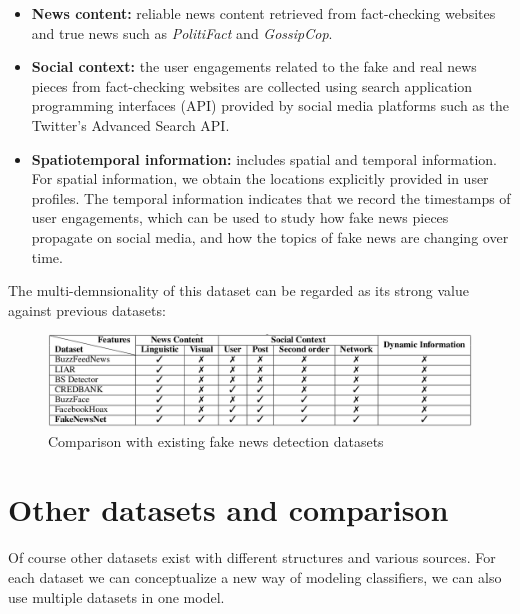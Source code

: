 \documentclass[10pt, english]{report}
\begin{document}
\begin{itemize}
\item \textbf{News content:} reliable news content retrieved from fact-checking websites and true news such as \textit{PolitiFact} and \textit{GossipCop}.
\item \textbf{Social context:} the user engagements related to the fake and real news pieces from fact-checking websites are collected using search application programming interfaces (API) provided by social media platforms such as the Twitter's Advanced Search API.
\item \textbf{Spatiotemporal information:} includes spatial and temporal information. For spatial information, we obtain the locations explicitly provided in user profiles. The temporal information indicates that we record the timestamps of user engagements, which can be used to study how fake news pieces propagate on social media, and how the topics of fake news are changing over time.
\end{itemize}

The multi-demnsionality of this dataset can be regarded as its strong value against previous datasets:

\begin{figure}[H]
	\centering
	\includegraphics[scale=0.43]{img/fake_news_net_comparison.png}
	\caption{Comparison with existing fake news detection datasets \cite{shu2018fakenewsnet}}
\end{figure}

\newpage
\section{Other datasets and comparison \cite{de2021identifying}}
Of course other datasets exist with different structures and various sources. For each dataset we can conceptualize a new way of modeling classifiers, we can also use multiple datasets in one model.\\
 
\end{document}
